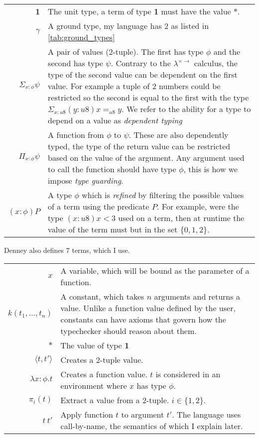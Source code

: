 \begin{tabular}{r|p{}}
    \textbf{1} &
    The unit type, a term of type \textbf{1} must have the value $\ast$.\\\cline{1-2}
    $\gamma$ &
    A ground type, my language has 2 as listed in \ref{tab:ground_types}\\\cline{1-2}
    $\Sigma_{x:\phi} \psi$ &
    A pair of values (2-tuple).
    The first has type $\phi$ and the second has type $\psi$.
    Contrary to the $\lambda^{\times \rightarrow}$ calculus, the type of the second value
    can be dependent on the first value.
    For example a tuple of 2 numbers could be restricted so the second is equal to the first with
    the type
    $\Sigma_{x: u8} (y: u8) x =_{u8} y$.
    We refer to the ability for a type to depend on a value as \textit{dependent typing}\\\cline{1-2}
    $\Pi_{x:\phi} \psi$ &
    A function from $\phi$ to $\psi$.
    These are also dependently typed, the type of the return value can be restricted based on the
    value of the argument.
    Any argument used to call the function should have type $\phi$, this is how we impose
    \textit{type guarding}.\\\cline{1-2}
    $(x:\phi)P$ &
    A type $\phi$ which is \textit{refined} by filtering the possible values of a term using the
    predicate $P$.
    For example, were the type $(x: u8) x < 3$ used on a term, then at runtime the value of the
    term must but in the set $\{0, 1, 2\}$.
\end{tabular}

Denney also defines 7 terms, which I use.

\begin{tabular}{r|p{}}
    $x$ &
    A variable, which will be bound as the parameter of a function.\\\cline{1-2}
    $k(t_1, ..., t_n)$ &
    A constant, which takes $n$ arguments and returns a value.
    Unlike a function value defined by the user, constants can have axioms that govern how the typechecker
    should reason about them.\\\cline{1-2}
    $\ast$ &
    The value of type \textbf{1}\\\cline{1-2}
    $\langle t, t' \rangle$ &
    Creates a 2-tuple value.\\\cline{1-2}
    $\lambda x: \phi . t$ &
    Creates a function value.
    $t$ is considered in an environment where $x$ has type $\phi$.\\\cline{1-2}
    $\pi_i(t)$ &
    Extract a value from a 2-tuple. $i \in \{1, 2\}$.\\\cline{1-2}
    $t\ t'$ &
    Apply function $t$ to argument $t'$.
    The language uses call-by-name, the semantics of which I explain later.
\end{tabular}

